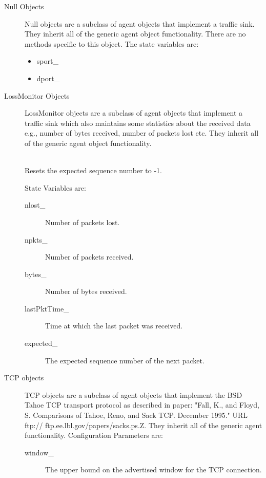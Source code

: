 \begin{description}

\item[Null Objects]
Null objects are a subclass of agent objects that implement a traffic
sink. They inherit all of the generic agent object functionality. There
are no methods specific to this object. The state variables are:
\begin{itemize}
\item sport\_
\item dport\_
\end{itemize}

\item[LossMonitor Objects]
LossMonitor objects are a subclass of agent objects that implement a
traffic sink which also maintains some statistics about the received data
e.g., number of bytes received, number of packets lost etc. They inherit
all of the generic agent object functionality. 

\\
Resets the expected sequence number to -1. 

State Variables are:
\begin{description}
\item[nlost\_] Number of packets lost. 

\item[npkts\_] Number of packets received. 

\item[bytes\_] Number of bytes received. 

\item[lastPktTime\_] Time at which the last packet was received. 

\item[expected\_] The expected sequence number of the next packet. 
\end{description}

\item[TCP objects]
TCP objects are a subclass of agent objects that implement the BSD Tahoe
TCP transport protocol as described in paper: "Fall, K., and Floyd, S.
Comparisons of Tahoe, Reno, and Sack TCP. December 1995." URL ftp://
ftp.ee.lbl.gov/papers/sacks.ps.Z. They inherit
all of the generic agent functionality. Configuration Parameters are:
\begin{description}

\item[window\_] The upper bound on the advertised window for the TCP
connection. 


\end{description}
\end{description}
